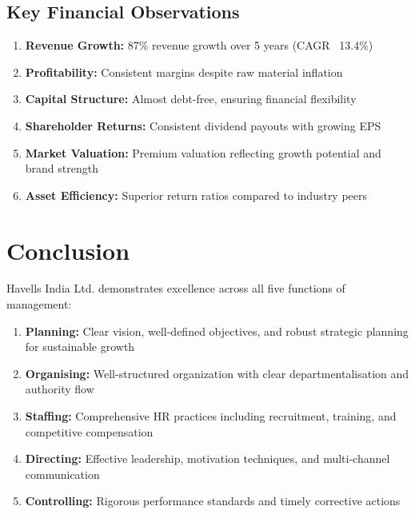 \documentclass[12pt,a4paper]{article}
\begin{document}
\subsection{Key Financial Observations}

\begin{enumerate}[leftmargin=*]
    \item \textbf{Revenue Growth:} 87\% revenue growth over 5 years (CAGR ~13.4\%)
    \item \textbf{Profitability:} Consistent margins despite raw material inflation
    \item \textbf{Capital Structure:} Almost debt-free, ensuring financial flexibility
    \item \textbf{Shareholder Returns:} Consistent dividend payouts with growing EPS
    \item \textbf{Market Valuation:} Premium valuation reflecting growth potential and brand strength
    \item \textbf{Asset Efficiency:} Superior return ratios compared to industry peers
\end{enumerate}

\newpage
\section{Conclusion}

Havells India Ltd. demonstrates excellence across all five functions of management:

\begin{enumerate}[leftmargin=*]
    \item \textbf{Planning:} Clear vision, well-defined objectives, and robust strategic planning for sustainable growth
    
    \item \textbf{Organising:} Well-structured organization with clear departmentalisation and authority flow
    
    \item \textbf{Staffing:} Comprehensive HR practices including recruitment, training, and competitive compensation
    
    \item \textbf{Directing:} Effective leadership, motivation techniques, and multi-channel communication
    
    \item \textbf{Controlling:} Rigorous performance standards and timely corrective actions
\end{enumerate}
\end{document}

